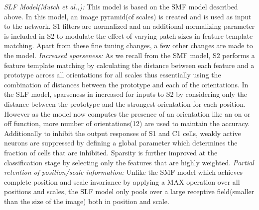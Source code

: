 \documentclass[12pt,twoside]{article}
\theoremstyle{plain}
\theoremstyle{definition}
\theoremstyle{remark}
\begin{document}
\textit{SLF Model(Mutch et al.,):} This model\cite{JimMutch2008} is based on the SMF model described above\cite{ThomasSerre2007}. In this model, an image pyramid(of scales) is created and is used as input to the network. S1 filters are normalized and an additional normalizing parameter is included in S2 to modulate the effect of varying patch sizes in feature template matching. Apart from these fine tuning changes, a few other changes are made to the model. \textit{Increased sparseness:} As we recall from the SMF model, S2 performs a feature template matching by calculating the distance between each feature and a prototype across all orientations for all scales thus essentially using the combination of distances between the prototype and each of the orientations. In the SLF model, sparseness in increased for inputs to S2 by considering only the distance between the prototype and the strongest orientation for each position. However as the model now computes the presence of an orientation like an on or off function, more number of orientations(12) are used to maintain the accuracy. Additionally to inhibit the output responses of S1 and C1 cells, weakly active neurons are suppressed by defining a global parameter which determines the fraction of cells that are inhibited. Sparsity is further improved at the classification stage by selecting only the features that are highly weighted. \textit{Partial retention of position/scale information:} Unlike the SMF model which achieves complete position and scale invariance by applying a MAX operation over all positions and scales, the SLF model only pools over a large receptive field(smaller than the size of the image) both in position and scale.\\\\
\end{document}

